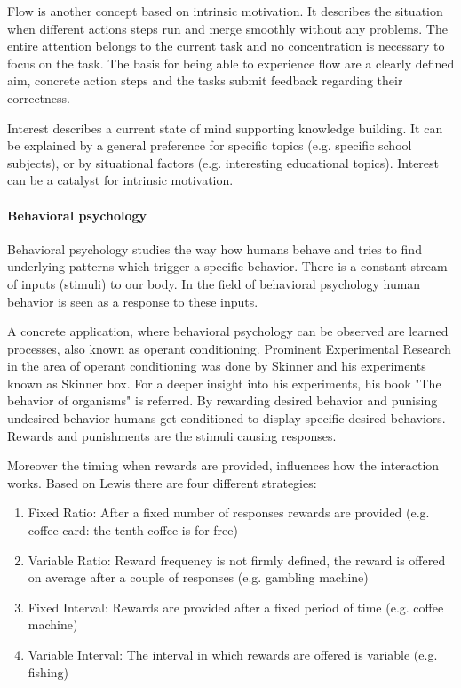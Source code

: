 \label{flow}
Flow is another concept based on intrinsic motivation. It describes the situation when different actions steps run and merge smoothly without any problems. The entire attention belongs to the current task and no concentration is necessary to focus on the task. The basis for being able to experience flow are a clearly defined aim, concrete action steps and the tasks submit feedback regarding their correctness. \cite[p. 19, 20, 21]{bierhoffeditorEnzyklopaediePsychologieSoziale2016}

Interest describes a current state of mind supporting knowledge building. It can be explained by a general preference for specific topics (e.g. specific school subjects), or by situational factors (e.g. interesting educational topics). Interest can be a catalyst for intrinsic motivation. \cite[p. 22, 23, 24]{bierhoffeditorEnzyklopaediePsychologieSoziale2016}

\paragraph*{Behavioral psychology}

Behavioral psychology studies the way how humans behave and tries to find underlying patterns which trigger a specific behavior. There is a constant stream of inputs (stimuli) to our body. In the field of  behavioral psychology human behavior is seen as a response to these inputs. \cite[p. 10]{lewisIrresistibleAppsMotivational2014}

A concrete application, where behavioral psychology can be observed are learned processes, also known as operant conditioning. Prominent Experimental Research in the area of operant conditioning was done by Skinner and his experiments known as Skinner box. For a deeper insight into his experiments, his book "The behavior of organisms" \cite{skinnerBehaviorOrganisms1938} is referred. By rewarding desired behavior and punising undesired behavior humans get conditioned to display specific desired behaviors. Rewards and punishments are the stimuli causing responses. \cite[p. 11]{lewisIrresistibleAppsMotivational2014}

Moreover the timing when rewards are provided, influences how the interaction works.
Based on Lewis \cite[p. 10]{lewisIrresistibleAppsMotivational2014} there are four different strategies:
\begin{enumerate}
	\item Fixed Ratio: After a fixed number of responses rewards are provided (e.g. coffee card: the tenth coffee is for free)
	\item Variable Ratio: Reward frequency is not firmly defined, the reward is offered on average after a couple of responses (e.g. gambling machine)
	\item Fixed Interval: Rewards are provided after a fixed period of time (e.g. coffee machine)
	\item Variable Interval: The interval in which rewards are offered is variable (e.g. fishing)
\end{enumerate}


